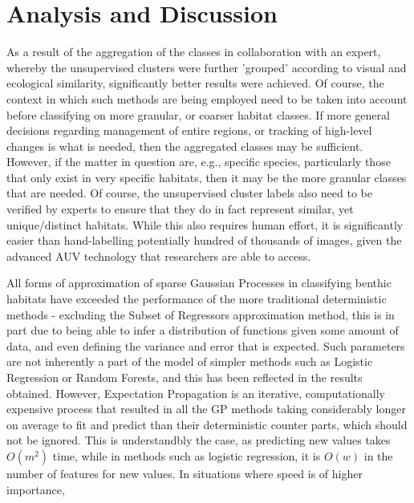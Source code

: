 \documentclass[journal]{IEEEtran}
\begin{document}
\section{Analysis and Discussion}

As a result of the aggregation of the classes in collaboration with an expert, whereby the unsupervised clusters were further 'grouped' according to visual and ecological similarity, significantly better results were achieved. Of course, the context in which such methods are being employed need to be taken into account before classifying on more granular, or coarser habitat classes. If more general decisions regarding management of entire regions, or tracking of high-level changes is what is needed, then the aggregated classes may be sufficient. However, if the matter in question are, e.g., specific species, particularly those that only exist in very specific habitats, then it may be the more granular classes that are needed. Of course, the unsupervised cluster labels also need to be verified by experts to ensure that they do in fact represent similar, yet unique/distinct habitats. While this also requires human effort, it is significantly easier than hand-labelling potentially hundred of thousands of images, given the advanced AUV technology that researchers are able to access.

All forms of approximation of sparse Gaussian Processes in classifying benthic habitats have exceeded the performance of the more traditional deterministic methods - excluding the Subset of Regressors approximation method, this is in part due to being able to infer a distribution of functions given some amount of data, and even defining the variance and error that is expected. Such parameters are not inherently a part of the model of simpler methods such as Logistic Regression or Random Forests, and this has been reflected in the results obtained. However, Expectation Propagation is an iterative, computationally expensive process that resulted in all the GP methods taking considerably longer on average to fit and predict than their deterministic counter parts, which should not be ignored. This is understandbly the case, as predicting new values takes $O(m^2)$ time, while in methods such as logistic regression, it is $O(w)$ in the number of features for new values. In situations where speed is of higher importance, 
\end{document}
